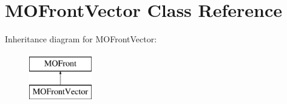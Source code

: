 \hypertarget{classMOFrontVector}{}\section{M\+O\+Front\+Vector Class Reference}
\label{classMOFrontVector}
Inheritance diagram for M\+O\+Front\+Vector\+:\begin{figure}[H]
\begin{center}
\leavevmode
\includegraphics[height=2.000000cm]{d3/d9e/classMOFrontVector}
\end{center}
\end{figure}
